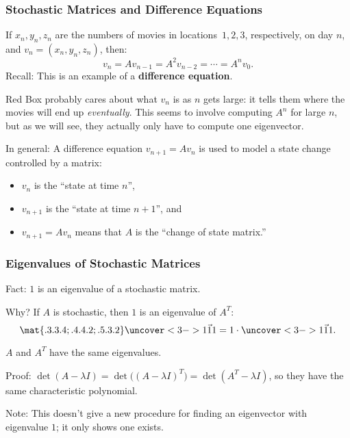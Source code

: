 \begin{frame}
\frametitle{Stochastic Matrices and Difference Equations}

If $x_n,y_n,z_n$ are the numbers of movies in locations~$1,2,3$, respectively,
on day $n$, and $v_n = (x_n,y_n,z_n)$, then:
\[ v_n = Av_{n-1} = A^2v_{n-2} = \cdots = A^nv_0. \]
\pause
\alert{Recall:} This is an example of a \textbf{difference equation}.

\pause\medskip
Red Box probably cares about what $v_n$ is as $n$ gets large: it tells them
where the movies will end up \emph{eventually}.
\pause
This seems to involve computing $A^n$ for large $n$, but as we will see, they
actually only have to compute one eigenvector.

\pause\bigskip
\alert{In general:} A difference equation $v_{n+1}=Av_n$ is used to model a
state change controlled by a matrix: 
\pause
\begin{itemize}
\item $v_n$ is the ``state at time $n$'',
\pause
\item $v_{n+1}$ is the ``state at time $n+1$'', and
\pause
\item $v_{n+1} = Av_n$ means that $A$ is the ``change of state matrix.''
\end{itemize}

\end{frame}



\begin{frame}
\frametitle{Eigenvalues of Stochastic Matrices}

\alert{Fact:} $1$ is an eigenvalue of a stochastic matrix.

\pause\medskip
\alert{Why?} If $A$ is stochastic, then $1$ is an eigenvalue of $A^T$:
\[ \mat{.3 .3 .4; .4 .4 .2; .5 .3 .2}\uncover<3->{\vec{1 1 1}} 
= 1\cdot\uncover<3->{\vec{1 1 1}}. \]

\pause[4]
\begin{lem}
  $A$ and $A^T$ have the same eigenvalues.
\end{lem}

\pause
\alert{Proof:} $\det(A-\lambda I) = \det\bigl( (A-\lambda I)^T \bigr)
= \det(A^T-\lambda I)$, so they have the same characteristic polynomial.

\pause\bigskip
\alert{Note:} This doesn't give a new procedure for finding an eigenvector with
eigenvalue $1$; it only shows one exists.

\end{frame}


